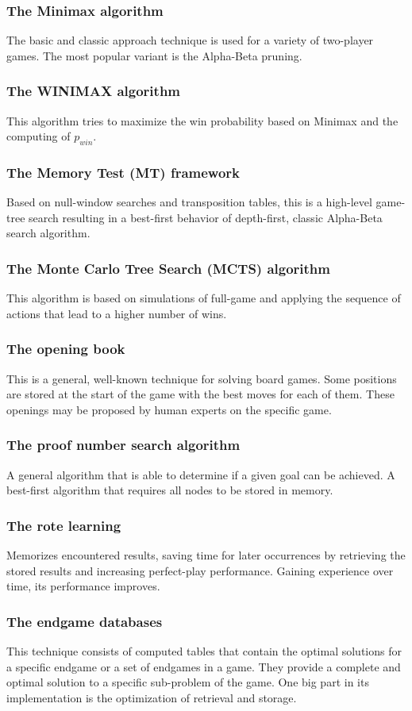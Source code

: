 \documentclass[journal]{IEEEtran}
\begin{document}
\subsubsection{The Minimax algorithm} The basic and classic approach technique is used for a variety of two-player games. The most popular variant is the Alpha-Beta pruning.
\subsubsection{The WINIMAX algorithm} This algorithm tries to maximize the win probability based on Minimax and the computing of $p_{win}$.
\subsubsection{The Memory Test (MT) framework} Based on null-window searches and transposition tables, this is a high-level game-tree search resulting in a best-first behavior of depth-first, classic Alpha-Beta search algorithm.
\subsubsection{The Monte Carlo Tree Search (MCTS) algorithm} This algorithm is based on simulations of full-game and applying the sequence of actions that lead to a higher number of wins.
\subsubsection{The opening book} This is a general, well-known technique for solving board games. Some positions are stored at the start of the game with the best moves for each of them. These openings may be proposed by human experts on the specific game.
\subsubsection{The proof number search algorithm} A general algorithm that is able to determine if a given goal can be achieved. A best-first algorithm that requires all nodes to be stored in memory.
\subsubsection{The rote learning} Memorizes encountered results, saving time for later occurrences by retrieving the stored results and increasing perfect-play performance. Gaining experience over time, its performance improves.
\subsubsection{The endgame databases} This technique consists of computed tables that contain the optimal solutions for a specific endgame or a set of endgames in a game. They provide a complete and optimal solution to a specific sub-problem of the game. One big part in its implementation is the optimization of retrieval and storage.
\end{document}
